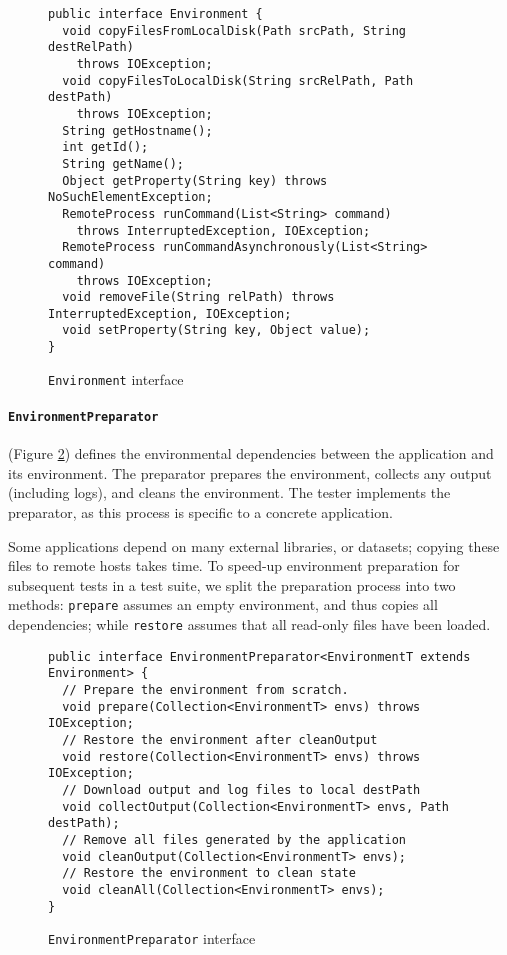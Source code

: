 \begin{figure}[tbp]
\begin{lstlisting}
public interface Environment {
  void copyFilesFromLocalDisk(Path srcPath, String destRelPath)
    throws IOException;
  void copyFilesToLocalDisk(String srcRelPath, Path destPath)
    throws IOException;
  String getHostname();
  int getId();
  String getName();
  Object getProperty(String key) throws NoSuchElementException;
  RemoteProcess runCommand(List<String> command)
    throws InterruptedException, IOException;
  RemoteProcess runCommandAsynchronously(List<String> command)
    throws IOException;
  void removeFile(String relPath) throws InterruptedException, IOException;
  void setProperty(String key, Object value);
}
\end{lstlisting}
\caption{\texttt{Environment} interface}
\label{fig:env_interface}
\end{figure}

\paragraph{\texttt{EnvironmentPreparator}} (Figure \ref{fig:envprepint}) defines the environmental dependencies between the application and its environment. The preparator prepares the environment, collects any output (including logs), and cleans the environment. The tester implements the preparator, as this process is specific to a concrete application.

Some applications depend on many external libraries, or datasets; copying these
files to remote hosts takes time.
To speed-up environment preparation for subsequent tests in a test suite, we
split the preparation process into two methods:
\texttt{prepare} assumes an empty environment, and thus copies all dependencies;
while \texttt{restore} assumes that all read-only files have been loaded.

\begin{figure}[tbp]
\begin{lstlisting}
public interface EnvironmentPreparator<EnvironmentT extends Environment> {
  // Prepare the environment from scratch.
  void prepare(Collection<EnvironmentT> envs) throws IOException;
  // Restore the environment after cleanOutput
  void restore(Collection<EnvironmentT> envs) throws IOException;
  // Download output and log files to local destPath
  void collectOutput(Collection<EnvironmentT> envs, Path destPath);
  // Remove all files generated by the application
  void cleanOutput(Collection<EnvironmentT> envs);
  // Restore the environment to clean state
  void cleanAll(Collection<EnvironmentT> envs);
}
\end{lstlisting}
\caption{\texttt{EnvironmentPreparator} interface}
\label{fig:envprepint}
\end{figure}

